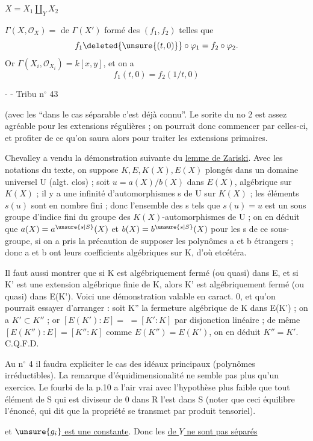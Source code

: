 $X=X_1\amalg_Y X_2$ 

$\Gamma(X,\mathcal O_X)=$   de $\Gamma(X')$ formé des $(f_1,f_2)$ telles que
\[
f_1\deleted{\unsure{(t,0)}}\circ\varphi_1=f_2\circ\varphi_2.
\]
Or $\Gamma(X_i,\mathcal O_{X_i})=k[x,y]$, et on a
\[
f_1(t,0)=f_2(1/t,0)
\]

-  -
Tribu n$^\circ$ 43

(avec les ``dans le cas séparable c'est déjà connu''. Le sorite du no 2 est assez agréable pour les extensions régulières ; on pourrait donc commencer par celles-ci, et profiter de ce qu'on saura alors pour traiter les extensions primaires.

Chevalley a vendu la démonstration suivante du \uline{lemme de Zariski}. Avec les notations du texte, on suppose $K,E,K(X),E(X)$ plongés dans un domaine universel U (algt. clos) ; soit $u=a(X)/b(X)$ dans $E(X)$, algébrique sur $K(X)$ ; il y a une infinité d'automorphismes s de U sur $K(X)$ ; les éléments $s(u)$ sont en nombre fini ; donc l'ensemble des s tels que $s(u)=u$ est un sous groupe d'indice fini du groupe des $K(X)$-automorphismes de U ; on en déduit que $a(X)=a^{\unsure{s|S}}(X)$ et $b(X)=b^{\unsure{s|S}}(X)$ pour les s de ce sous-groupe, si on a pris la précaution de supposer les polynômes a et b étrangers ; donc a et b ont leurs coefficients algébriques sur K, d'où etcétéra.

Il faut aussi montrer que si K est algébriquement fermé (ou quasi) dans E, et si K' est une extension algébrique finie de K, alors K' est algébriquement fermé (ou quasi) dans E(K'). Voici une démonstration valable en caract. 0, et qu'on pourrait essayer d'arranger : soit K'' la fermeture algébrique de K dans E(K') ; on a $K'\subset K''$ ; or $[E(K'):E]=$ $=[K':K]$ par disjonction linéaire ; de même $[E(K''):E]=[K'':K]$ comme $E(K'')=E(K')$, on en déduit $K''=K'$. C.Q.F.D.

Au n$^\circ$ 4 il faudra expliciter le cas des idéaux principaux (polynômes irréductibles). La remarque d'équidimensionalité ne semble pas plus qu'un exercice. Le fourbi de la p.10 a l'air vrai avec l'hypothèse plus faible que tout élément de S qui est diviseur de 0 dans R l'est dans S (noter que ceci équilibre l'énoncé, qui dit que la propriété se transmet par produit tensoriel).


    et \uline{$\unsure{g_i}$ est une constante}. Donc les \uline{ de $Y$ ne sont pas séparés}

